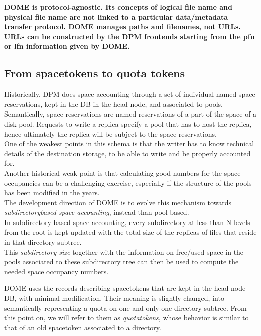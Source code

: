 \documentclass[a4paper,10pt]{scrreprt}
\begin{document}
\textbf{DOME is protocol-agnostic. Its concepts of logical file name and physical file name are not linked to a particular data/metadata transfer protocol.
DOME manages paths and filenames, not URLs. URLs can be constructed by the DPM frontends starting from the pfn or lfn information given by DOME.}


\subsection{From spacetokens to quota tokens}
Historically, DPM does space accounting through a set of individual named space reservations, kept in the DB in the head node, and associated to pools.\\
Semantically, space reservations are named reservations of a part of the space of a disk pool. Requests to write a replica specify a pool
that has to host the replica, hence ultimately the replica will be subject to the space reservations.\\

One of the weakest points in this schema is that the writer has to know technical details of the destination storage, to be able to write
and be properly accounted for.\\

Another historical weak point is that calculating good numbers for the space occupancies can be a challenging exercise, especially if the structure of the pools
has been modified in the years.\\
The development direction of DOME is to evolve this mechanism towards \textit{subdirectory\-based space accounting}, instead than pool-based.\\

In subdirectory-based space accounting, every subdirectory at less than N levels from the root is kept updated with the total size of the replicas
of files that reside in that directory subtree.\\

This \textit{subdirectory size} together with the information on free/used space in the pools associated to these subdirectory tree
can then be used to compute the needed space occupancy numbers.

DOME uses the records describing spacetokens that are kept in the head node DB, with minimal modification. Their meaning is slightly changed,
into semantically representing a quota on one and only one directory subtree. From this point on, we will refer to them as \textit{quotatokens},
whose behavior is similar to that of an old spacetoken associated to a directory.\\
\end{document}
